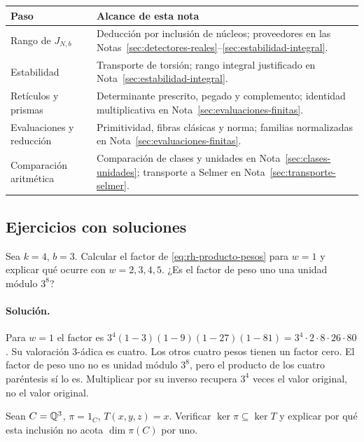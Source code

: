 \begin{center}\small
\begin{tabularx}{\textwidth}{@{}p{}Y@{}}
\toprule
Paso & Alcance de esta nota\\\midrule
Rango de $J_{N,b}$ & Deducción por inclusión de núcleos; proveedores en las Notas~\ref{sec:detectores-reales}--\ref{sec:estabilidad-integral}.\\
Estabilidad & Transporte de torsión; rango integral justificado en Nota~\ref{sec:estabilidad-integral}.\\
Retículos y prismas & Determinante prescrito, pegado y complemento; identidad multiplicativa en Nota~\ref{sec:evaluaciones-finitas}.\\
Evaluaciones y reducción & Primitividad, fibras clásicas y norma; familias normalizadas en Nota~\ref{sec:evaluaciones-finitas}.\\
Comparación aritmética & Comparación de clases y unidades en Nota~\ref{sec:clases-unidades}; transporte a Selmer en Nota~\ref{sec:transporte-selmer}.\\\bottomrule
\end{tabularx}
\end{center}

\subsection{Ejercicios con soluciones}

\begin{ejercicio}
Sea $k=4$, $b=3$. Calcular el factor de \eqref{eq:rh-producto-pesos} para $w=1$ y explicar qué ocurre con $w=2,3,4,5$. ¿Es el factor de peso uno una unidad módulo $3^8$?
\end{ejercicio}
\paragraph{Solución.} Para $w=1$ el factor es $3^4(1-3)(1-9)(1-27)(1-81)=3^4\cdot2\cdot8\cdot26\cdot80$. Su valoración $3$-ádica es cuatro. Los otros cuatro pesos tienen un factor cero. El factor de peso uno no es unidad módulo $3^8$, pero el producto de los cuatro paréntesis sí lo es. Multiplicar por su inverso recupera $3^4$ veces el valor original, no el valor original.

\begin{ejercicio}
Sean $C=\mathbb{Q}^3$, $\pi=1_C$, $T(x,y,z)=x$. Verificar $\ker\pi\subseteq\ker T$ y explicar por qué esta inclusión no acota $\dim\pi(C)$ por uno.
\end{ejercicio}
